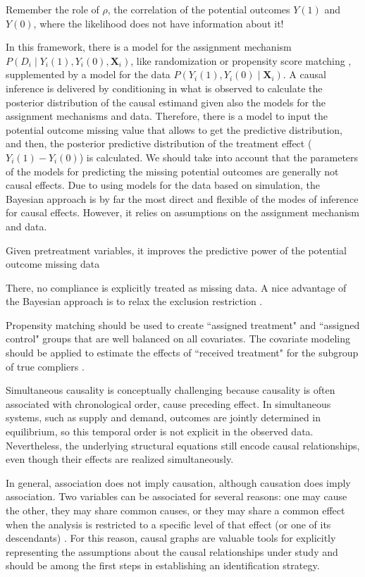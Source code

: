 Remember the role of $\rho$, the correlation of the potential outcomes $Y(1)$ and $Y(0)$, where the likelihood does not have information about it!

In this framework, there is a model for the assignment mechanism $P(D_i\mid Y_i(1), Y_i(0), \mathbf{X}_i)$, like randomization or propensity score matching \cite{rosenbaum1983central}, supplemented by a model for the data $P(Y_i(1), Y_i(0)\mid \mathbf{X}_i)$. A causal inference is delivered by conditioning in what is observed to calculate the posterior distribution of the causal estimand given also the models for the assignment mechanisms and data. Therefore, there is a model to input the potential outcome missing value that allows to get the predictive distribution, and then, the posterior predictive distribution of the treatment effect ($Y_i(1)-Y_i(0)$) is calculated. We should take into account that the parameters of the models for predicting the missing potential outcomes are generally not causal effects. Due to using models for the data based on simulation, the Bayesian approach is by far the most direct and flexible of the modes of inference for causal effects. However, it relies on assumptions on the assignment mechanism and data.

Given pretreatment variables, it improves the predictive power of the potential outcome missing data

There, no compliance is explicitly treated as missing data. A nice advantage of the Bayesian approach is to relax the exclusion restriction \cite{rubin2004teaching}.

Propensity matching should be used to create ``assigned treatment" and ``assigned control" groups that are well balanced on all covariates. The covariate modeling should be applied to estimate the effects of ``received treatment" for the subgroup of true compliers \cite{rubin2004teaching}.

Simultaneous causality is conceptually challenging because causality is often associated with chronological order, cause preceding effect. In simultaneous systems, such as supply and demand, outcomes are jointly determined in equilibrium, so this temporal order is not explicit in the observed data. Nevertheless, the underlying structural equations still encode causal relationships, even though their effects are realized simultaneously.

In general, association does not imply causation, although causation does imply association. Two variables can be associated for several reasons: one may cause the other, they may share common causes, or they may share a common effect when the analysis is restricted to a specific level of that effect (or one of its descendants) \cite{hernan2020causal}. For this reason, causal graphs are valuable tools for explicitly representing the assumptions about the causal relationships under study and should be among the first steps in establishing an identification strategy.

